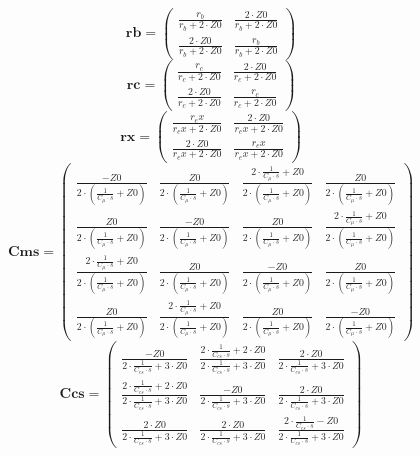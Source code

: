 \[ \mathbf{rb}=\left(\begin{smallmatrix} \frac{r_b}{r_b+2\cdot Z0} &
\frac{2\cdot Z0}{r_b+2\cdot Z0} \\ \frac{2\cdot Z0}{r_b+2\cdot Z0} &
\frac{r_b}{r_b+2\cdot Z0} \end{smallmatrix}\right) \]
\[ \mathbf{rc}=\left(\begin{smallmatrix} \frac{r_c}{r_c+2\cdot Z0} &
\frac{2\cdot Z0}{r_c+2\cdot Z0} \\ \frac{2\cdot Z0}{r_c+2\cdot Z0} &
\frac{r_c}{r_c+2\cdot Z0} \end{smallmatrix}\right) \]
\[ \mathbf{rx}=\left(\begin{smallmatrix} \frac{r_ex}{r_ex+2\cdot Z0} &
\frac{2\cdot Z0}{r_ex+2\cdot Z0} \\ \frac{2\cdot Z0}{r_ex+2\cdot Z0} &
\frac{r_ex}{r_ex+2\cdot Z0} \end{smallmatrix}\right) \]
\[ \mathbf{Cms}=\left(\begin{smallmatrix} \frac{-Z0}{2\cdot
(\frac{1}{C_{\mu}\cdot s}+Z0 )} & \frac{Z0}{2\cdot
(\frac{1}{C_{\mu}\cdot s}+Z0 )} & \frac{2\cdot \frac{1}{C_{\mu}\cdot
s}+Z0}{2\cdot  (\frac{1}{C_{\mu}\cdot s}+Z0 )} & \frac{Z0}{2\cdot
(\frac{1}{C_{\mu}\cdot s}+Z0 )} \\ \frac{Z0}{2\cdot
(\frac{1}{C_{\mu}\cdot s}+Z0 )} & \frac{-Z0}{2\cdot
(\frac{1}{C_{\mu}\cdot s}+Z0 )} & \frac{Z0}{2\cdot
(\frac{1}{C_{\mu}\cdot s}+Z0 )} & \frac{2\cdot \frac{1}{C_{\mu}\cdot
s}+Z0}{2\cdot  (\frac{1}{C_{\mu}\cdot s}+Z0 )} \\ \frac{2\cdot
\frac{1}{C_{\mu}\cdot s}+Z0}{2\cdot  (\frac{1}{C_{\mu}\cdot s}+Z0 )} &
\frac{Z0}{2\cdot  (\frac{1}{C_{\mu}\cdot s}+Z0 )} & \frac{-Z0}{2\cdot
(\frac{1}{C_{\mu}\cdot s}+Z0 )} & \frac{Z0}{2\cdot
(\frac{1}{C_{\mu}\cdot s}+Z0 )} \\ \frac{Z0}{2\cdot
(\frac{1}{C_{\mu}\cdot s}+Z0 )} & \frac{2\cdot \frac{1}{C_{\mu}\cdot
s}+Z0}{2\cdot  (\frac{1}{C_{\mu}\cdot s}+Z0 )} & \frac{Z0}{2\cdot
(\frac{1}{C_{\mu}\cdot s}+Z0 )} & \frac{-Z0}{2\cdot
(\frac{1}{C_{\mu}\cdot s}+Z0 )} \end{smallmatrix}\right) \]
\[ \mathbf{Ccs}=\left(\begin{smallmatrix} \frac{-Z0}{2\cdot
\frac{1}{C_{cs}\cdot s}+3\cdot Z0} & \frac{2\cdot \frac{1}{C_{cs}\cdot
s}+2\cdot Z0}{2\cdot \frac{1}{C_{cs}\cdot s}+3\cdot Z0} & \frac{2\cdot
Z0}{2\cdot \frac{1}{C_{cs}\cdot s}+3\cdot Z0} \\ \frac{2\cdot
\frac{1}{C_{cs}\cdot s}+2\cdot Z0}{2\cdot \frac{1}{C_{cs}\cdot
s}+3\cdot Z0} & \frac{-Z0}{2\cdot \frac{1}{C_{cs}\cdot s}+3\cdot Z0} &
\frac{2\cdot Z0}{2\cdot \frac{1}{C_{cs}\cdot s}+3\cdot Z0} \\
\frac{2\cdot Z0}{2\cdot \frac{1}{C_{cs}\cdot s}+3\cdot Z0} &
\frac{2\cdot Z0}{2\cdot \frac{1}{C_{cs}\cdot s}+3\cdot Z0} &
\frac{2\cdot \frac{1}{C_{cs}\cdot s}-Z0}{2\cdot \frac{1}{C_{cs}\cdot
s}+3\cdot Z0} \end{smallmatrix}\right) \]
